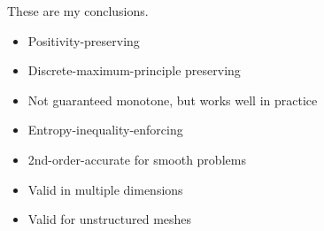 These are my conclusions.
    \begin{itemize}
      \item Positivity-preserving
      \item Discrete-maximum-principle preserving
      \item Not guaranteed monotone, but works well in practice
      \item Entropy-inequality-enforcing
      \item 2nd-order-accurate for smooth problems
      \item Valid in multiple dimensions
      \item Valid for unstructured meshes
    \end{itemize}
